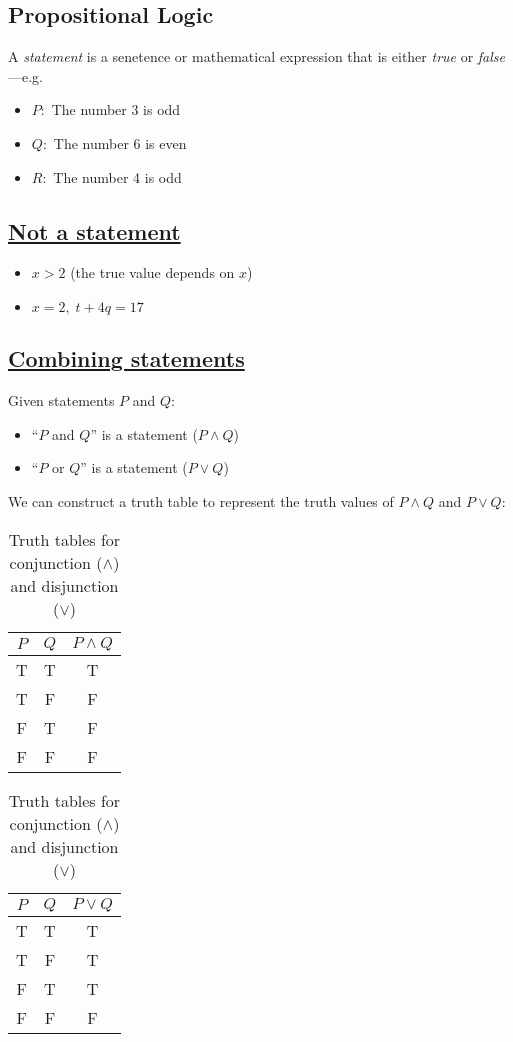 \documentclass[../main.tex]{subfiles}
\begin{document}
\subsection{Propositional Logic}

A \emph{statement} is a senetence or mathematical expression that is either \emph{true} or
\emph{false}---e.g.
\begin{itemize}
    \item $P:$ The number 3 is odd
    \item $Q:$ The number 6 is even
    \item $R:$ The number 4 is odd
\end{itemize}

\subsection*{\underline{Not a statement}}
\begin{itemize}
    \item $x > 2$ (the true value depends on $x$)
    \item $x = 2, \; t + 4q = 17$
\end{itemize}

\subsection*{\underline{Combining statements}}

Given statements $P$ and $Q$:
\begin{itemize}
    \item ``$P$ and $Q$'' is a statement ($P \land Q$)
    \item ``$P$ or $Q$'' is a statement ($P \lor Q$)
\end{itemize}

We can construct a truth table to represent the truth values of $P \land Q$ and $P \lor Q$:
\begin{table}[ht]
    \centering
    \begin{tabular}{c|c|c}
        $P$ & $Q$ & $P \land Q$ \\
        \hline
        T & T & T \\
        T & F & F \\
        F & T & F \\
        F & F & F
    \end{tabular}
    \hspace{2cm}
    \begin{tabular}{c|c|c}
        $P$ & $Q$ & $P \lor Q$ \\
        \hline
        T & T & T \\
        T & F & T \\
        F & T & T \\
        F & F & F
    \end{tabular}
    \caption{Truth tables for conjunction ($\land$) and disjunction ($\lor$)}
\end{table}
\end{document}
